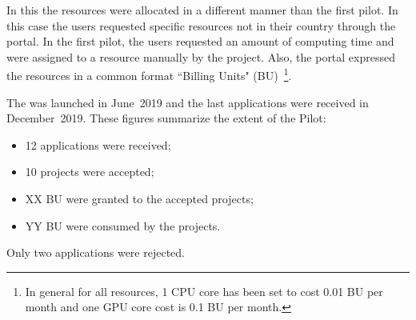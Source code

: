 In this \pilot the resources were allocated in a different manner than the first pilot.
In this case the users requested specific resources not in their country through the portal. 
In the first pilot, the users requested an amount of computing time and were assigned to a resource manually by the \dell project.
Also, the portal expressed the \einfra resources in a common format ``Billing Units" (BU)~\footnote{In general for all \dell resources, 1 CPU core has been set to cost 0.01 BU per month and one GPU core cost is 0.1 BU per month.}.

The \dell \pilot was launched in June~2019 and the last applications were received in December~2019. 
These figures summarize the extent of the Pilot:
\begin{itemize}
\item 12 applications were received;
\item 10 projects were accepted;
\item XX BU were granted to the accepted projects;
\item YY BU were consumed by the projects.
\end{itemize}
Only two applications were rejected. 

